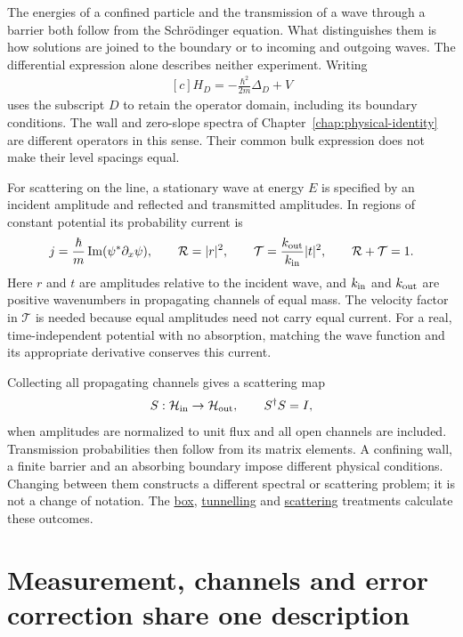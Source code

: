 \documentclass[11pt,oneside]{book}
\newenvironment{centeredalign}{\[\begin{gathered}[c]}{\end{gathered}\]}
\begin{document}
The energies of a confined particle and the transmission of a wave through
a barrier both follow from the Schr\"odinger equation. What distinguishes
them is how solutions are joined to the boundary or to incoming and
outgoing waves. The differential expression alone describes neither
experiment. Writing
\begin{centeredalign}
H_D=-\frac{\hbar^2}{2m}\Delta_D+V
\end{centeredalign}
uses the subscript \(D\) to retain the operator domain, including its
boundary conditions. The wall and zero-slope spectra of
Chapter~\ref{chap:physical-identity} are different operators in this sense.
Their common bulk expression does not make their level spacings equal.

For scattering on the line, a stationary wave at energy \(E\) is specified
by an incident amplitude and reflected and transmitted amplitudes. In
regions of constant potential its probability current is
\begin{centeredalign}
j=\frac{\hbar}{m}\operatorname{Im}(\psi^*\partial_x\psi),\qquad
\mathcal R=|r|^2,\qquad
\mathcal T=\frac{k_{\rm out}}{k_{\rm in}}|t|^2,\qquad
\mathcal R+\mathcal T=1.
\end{centeredalign}
Here \(r\) and \(t\) are amplitudes relative to the incident wave, and
\(k_{\rm in}\) and \(k_{\rm out}\) are positive wavenumbers in propagating
channels of equal mass. The velocity factor in \(\mathcal T\) is needed
because equal amplitudes need not carry equal current. For a real,
time-independent potential with no absorption, matching the wave function
and its appropriate derivative conserves this current.

Collecting all propagating channels gives a scattering map
\begin{centeredalign}
S:\mathcal H_{\rm in}\to\mathcal H_{\rm out},\qquad S^\dagger S=I,
\end{centeredalign}
when amplitudes are normalized to unit flux and all open channels are
included. Transmission probabilities then follow from its matrix elements.
A confining wall, a finite barrier and an absorbing boundary impose
different physical conditions. Changing between them constructs a different
spectral or scattering problem; it is not a change of notation. The
\hyperref[topic:particle-in-a-box]{box},
\hyperref[topic:quantum-tunnelling]{tunnelling} and
\hyperref[topic:scattering]{scattering} treatments calculate these outcomes.


\section{Measurement, channels and error correction share one description}
\end{document}
